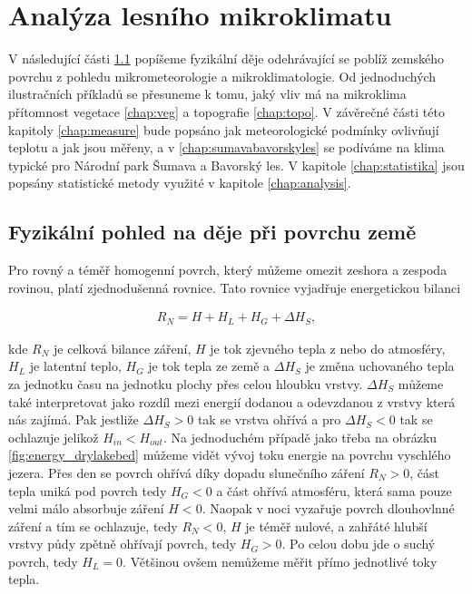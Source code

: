 \chapter{Analýza lesního mikroklimatu}\label{chap:ch1}

V následující části \ref{chap:fyz} popíšeme fyzikální děje odehrávající se poblíž zemského povrchu z pohledu mikrometeorologie a mikroklimatologie. Od jednoduchých ilustračních příkladů se přesuneme k tomu, jaký vliv má na mikroklima přítomnost vegetace \ref{chap:veg} a topografie \ref{chap:topo}. V závěrečné části této kapitoly \ref{chap:measure} bude popsáno jak meteorologické podmínky ovlivňují teplotu a jak jsou měřeny, a v \ref{chap:sumavabavorskyles} se podíváme na klima typické pro Národní park Šumava a Bavorský les. V kapitole \ref{chap:statistika} jsou popsány statistické metody využité v kapitole \ref{chap:analysis}.

\section{Fyzikální pohled na děje při povrchu země} \label{chap:fyz}
Pro rovný a téměř homogenní povrch, který můžeme omezit zeshora a zespoda rovinou, platí zjednodušenná rovnice. Tato rovnice vyjadřuje energetickou bilanci\cite{arya2001}

\begin{gather}\label{eq:bilance}
R_N = H + H_L + H_G + \Delta H_S,
\end{gather}

kde $R_N$ je celková bilance záření, $H$ je tok zjevného tepla z nebo do atmosféry, $H_L$ je latentní teplo, $H_G$ je tok tepla ze země a $\Delta H_S$ je změna uchovaného tepla za jednotku času na jednotku plochy přes celou hloubku vrstvy. $\Delta H_S$ můžeme také interpretovat jako rozdíl mezi energií dodanou a odevzdanou z vrstvy která nás zajímá. Pak jestliže $\Delta H_S>0$ tak se vrstva ohřívá a pro $\Delta H_S<0$ tak se ochlazuje jelikož $H_{in}<H_{out}$. Na jednoduchém případě jako třeba na obrázku \ref{fig:energy_drylakebed} můžeme vidět vývoj toku energie na povrchu vyschlého jezera. Přes den se povrch ohřívá díky dopadu slunečního záření $R_N>0$, část tepla uniká pod povrch tedy $H_G<0$ a část ohřívá atmosféru, která sama pouze velmi málo absorbuje záření $H<0$. Naopak v noci vyzařuje povrch dlouhovlnné záření a tím se ochlazuje, tedy $R_N<0$, $H$ je téměř nulové, a zahřáté hlubší vrstvy půdy zpětně ohřívají povrch, tedy $H_G>0$. Po celou dobu jde o suchý povrch, tedy $H_L=0$\cite{arya2001}. Většinou ovšem nemůžeme měřit přímo jednotlivé toky tepla.

